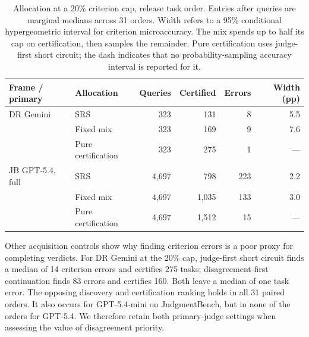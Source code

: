 \documentclass[10pt,letterpaper]{article}
\begin{document}
\begin{table}[t]
\centering\small
\caption{Allocation at a 20\% criterion cap, release task order. Entries after queries are marginal medians across 31 orders. Width refers to a 95\% conditional hypergeometric interval for criterion microaccuracy. The mix spends up to half its cap on certification, then samples the remainder. Pure certification uses judge-first short circuit; the dash indicates that no probability-sampling accuracy interval is reported for it.}
\label{tab:allocation}
\begin{tabular}{llrrrr}
\toprule
Frame / primary & Allocation & Queries & Certified & Errors & Width (pp)\\
\midrule
DR Gemini & SRS & 323 & 131 & 8 & 5.5\\
& Fixed mix & 323 & 169 & 9 & 7.6\\
& Pure certification & 323 & 275 & 1 & ---\\
JB GPT-5.4, full & SRS & 4,697 & 798 & 223 & 2.2\\
& Fixed mix & 4,697 & 1,035 & 133 & 3.0\\
& Pure certification & 4,697 & 1,512 & 15 & ---\\
\bottomrule
\end{tabular}
\end{table}

Other acquisition controls show why finding criterion errors is a poor proxy for completing verdicts. For DR Gemini at the 20\% cap, judge-first short circuit finds a median of 14 criterion errors and certifies 275 tasks; disagreement-first continuation finds 83 errors and certifies 160. Both leave a median of one task error. The opposing discovery and certification ranking holds in all 31 paired orders. It also occurs for GPT-5.4-mini on JudgmentBench, but in none of the orders for GPT-5.4. We therefore retain both primary-judge settings when assessing the value of disagreement priority.
\end{document}
